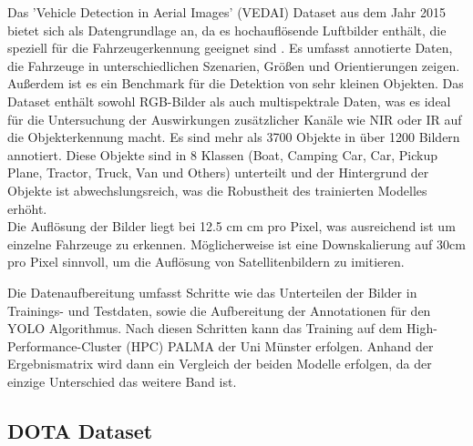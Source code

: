 Das 'Vehicle Detection in Aerial Images' (VEDAI) Dataset \cite{vedai_web}  aus dem Jahr 2015 bietet sich als Datengrundlage an, da es hochauflösende Luftbilder enthält, die speziell für die Fahrzeugerkennung geeignet sind \cite{Razakarivony2015}. Es umfasst annotierte Daten, die Fahrzeuge in unterschiedlichen Szenarien, Größen und Orientierungen zeigen. Außerdem ist es ein Benchmark für die Detektion von sehr kleinen Objekten. Das Dataset enthält sowohl RGB-Bilder als auch multispektrale Daten, was es ideal für die Untersuchung der Auswirkungen zusätzlicher Kanäle wie NIR oder IR auf die Objekterkennung macht. Es sind mehr als 3700 Objekte in über 1200 Bildern annotiert. Diese Objekte sind in 8 Klassen (Boat, Camping Car, Car, Pickup Plane, Tractor, Truck, Van und Others) unterteilt und der Hintergrund der Objekte ist abwechslungsreich, was die Robustheit des trainierten Modelles erhöht. \\
Die Auflösung der Bilder liegt bei 12.5 cm  cm pro Pixel, was ausreichend ist um einzelne Fahrzeuge zu erkennen. Möglicherweise ist eine Downskalierung auf 30cm pro Pixel sinnvoll, um die Auflösung von Satellitenbildern zu imitieren.
 

Die Datenaufbereitung umfasst Schritte wie das Unterteilen der Bilder in Trainings- und Testdaten, sowie die Aufbereitung der Annotationen für den YOLO Algorithmus. Nach diesen Schritten kann das Training auf dem High-Performance-Cluster (HPC) PALMA der Uni Münster erfolgen. Anhand der Ergebnismatrix wird dann ein Vergleich der beiden Modelle erfolgen, da der einzige Unterschied das weitere Band ist. 

\subsection{DOTA Dataset}

\else
\blindtext
\fi

